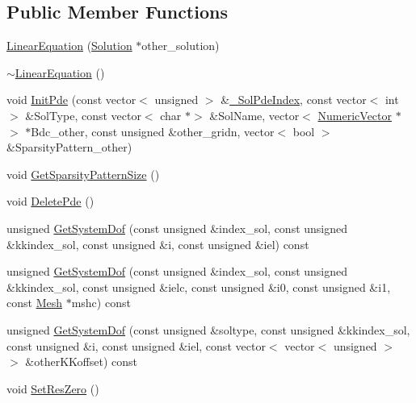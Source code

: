 \subsection*{Public Member Functions}
\begin{DoxyCompactItemize}
\item 
\mbox{\hyperlink{classfemus_1_1_linear_equation_ac82d0ae000e0921cb2ba01ff93dcef45}{Linear\+Equation}} (\mbox{\hyperlink{classfemus_1_1_solution}{Solution}} $\ast$other\+\_\+solution)
\item 
\mbox{\hyperlink{classfemus_1_1_linear_equation_ade8ffc26092dc955956e95eaad9443e6}{$\sim$\+Linear\+Equation}} ()
\item 
void \mbox{\hyperlink{classfemus_1_1_linear_equation_a2081cb3a1ffa45087e78fa1019010987}{Init\+Pde}} (const vector$<$ unsigned $>$ \&\mbox{\hyperlink{classfemus_1_1_linear_equation_a8b868f08fce043a674a7dd36019142df}{\+\_\+\+Sol\+Pde\+Index}}, const vector$<$ int $>$ \&Sol\+Type, const vector$<$ char $\ast$$>$ \&Sol\+Name, vector$<$ \mbox{\hyperlink{classfemus_1_1_numeric_vector}{Numeric\+Vector}} $\ast$$>$ $\ast$Bdc\+\_\+other, const unsigned \&other\+\_\+gridn, vector$<$ bool $>$ \&Sparsity\+Pattern\+\_\+other)
\item 
void \mbox{\hyperlink{classfemus_1_1_linear_equation_ad3053db3500d06e996703acf43efbcd7}{Get\+Sparsity\+Pattern\+Size}} ()
\item 
void \mbox{\hyperlink{classfemus_1_1_linear_equation_a860b182e81b87527451d0dce8d80a50e}{Delete\+Pde}} ()
\item 
unsigned \mbox{\hyperlink{classfemus_1_1_linear_equation_a4e339f53ed51e108cd33e1577dae9c18}{Get\+System\+Dof}} (const unsigned \&index\+\_\+sol, const unsigned \&kkindex\+\_\+sol, const unsigned \&i, const unsigned \&iel) const
\item 
unsigned \mbox{\hyperlink{classfemus_1_1_linear_equation_a97d5328122e7841e3edd0713947b2031}{Get\+System\+Dof}} (const unsigned \&index\+\_\+sol, const unsigned \&kkindex\+\_\+sol, const unsigned \&ielc, const unsigned \&i0, const unsigned \&i1, const \mbox{\hyperlink{classfemus_1_1_mesh}{Mesh}} $\ast$mshc) const
\item 
unsigned \mbox{\hyperlink{classfemus_1_1_linear_equation_a6215eca33ce5d030718985a8cb05eaab}{Get\+System\+Dof}} (const unsigned \&soltype, const unsigned \&kkindex\+\_\+sol, const unsigned \&i, const unsigned \&iel, const vector$<$ vector$<$ unsigned $>$ $>$ \&other\+K\+Koffset) const
\item 
void \mbox{\hyperlink{classfemus_1_1_linear_equation_a81de0961933510a8e2e035be1cfb4730}{Set\+Res\+Zero}} ()

\end{DoxyCompactItemize}
